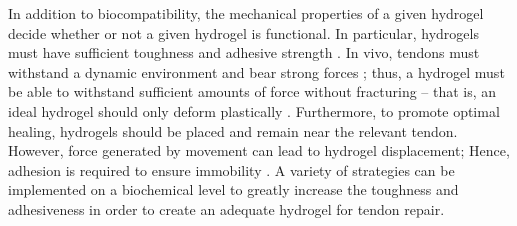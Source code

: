 In addition to biocompatibility, the mechanical properties of a given hydrogel decide whether or not a given hydrogel is functional. In particular, hydrogels must have sufficient toughness and adhesive strength \autocite{freedmanEnhancedTendonHealing2022}. In vivo, tendons must withstand a dynamic environment and bear strong forces \autocite{ChenAdvancesApplicationHydrogel}; thus, a hydrogel must be able to withstand sufficient amounts of force without fracturing – that is, an ideal hydrogel should only deform plastically \autocite{freedmanEnhancedTendonHealing2022}. Furthermore, to promote optimal healing, hydrogels should be placed and remain near the relevant tendon. However, force generated by movement can lead to hydrogel displacement; Hence, adhesion is required to ensure immobility \autocite{freedmanEnhancedTendonHealing2022}. A variety of strategies can be implemented on a biochemical level to greatly increase the toughness and adhesiveness in order to create an adequate hydrogel for tendon repair.
